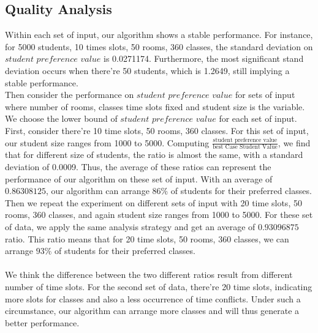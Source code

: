 \documentclass[11pt, oneside]{article}   	%
\begin{document}
\subsection{Quality Analysis}
Within each set of input, our algorithm shows a stable performance. For instance, for 5000 students, 10 times slots, 50 rooms, 360 classes, the standard deviation on $student$  $preference$  $value$ is 0.0271174. Furthermore, the most significant stand deviation occurs when there're 50 students, which is 1.2649, still implying a stable performance. 
\\Then consider the performance on $student$ $preference$ $value$ for sets of input where number of rooms, classes time slots fixed and student size is the variable. We choose the lower bound of $student$ $preference$ $value$ for each set of input. First, consider there're 10 time slots, 50 rooms, 360 classes. For this set of input, our student size ranges from 1000 to 5000. Computing $\frac{\text{student preference value}}{\text{best Case Student Value}}$, we find that for different size of students, the ratio is almost the same, with a standard deviation of 0.0009. Thus, the average of these ratios can represent the performance of our algorithm on these set of input. With an average of $0.86308125$, our algorithm can arrange $86\%$ of students for their preferred classes. Then we repeat the experiment on different sets of input with 20 time slots, 50 rooms, 360 classes, and again student size ranges from 1000 to 5000. For these set of data, we apply the same analysis strategy and get an average of $0.93096875$ ratio. This ratio means that for 20 time slots, 50 rooms, 360 classes, we can arrange $93\%$ of students for their preferred classes.\\
\\We think the difference between the two different ratios result from different number of time slots. For the second set of data, there're 20 time slots, indicating more slots for classes and also a less occurrence of time conflicts. Under such a circumstance, our algorithm can arrange more classes and will thus generate a better performance.
\end{document}
